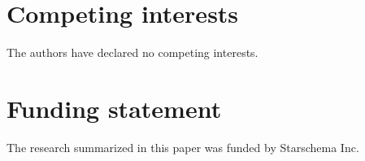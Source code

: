 \documentclass[fleqn,10pt]{SelfArx} %
\begin{document}


\section*{Competing interests} %


The authors have declared no competing interests.

\section*{Funding statement} %


The research summarized in this paper was funded by Starschema Inc.





\end{document}
